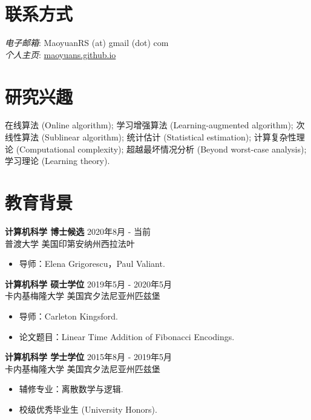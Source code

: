 \documentclass[margin, 10pt]{res} %
\begin{document}
\begin{resume}

\section{联系方式}
\emph{电子邮箱}: MaoyuanRS (at) gmail (dot) com\\
\emph{个人主页}: \href{https://maoyuans.github.io}{maoyuans.github.io}

 
\section{研究兴趣}  

在线算法 (Online algorithm); 学习增强算法 (Learning-augmented algorithm); 次线性算法 (Sublinear algorithm); 统计估计 (Statistical estimation); 计算复杂性理论 (Computational complexity); 超越最坏情况分析 (Beyond worst-case analysis); 学习理论 (Learning theory).

\section{教育背景}

{\bf 计算机科学\; 博士候选} \hfill 2020年8月 - 当前 \\
普渡大学 \hfill 美国印第安纳州西拉法叶

\begin{itemize}
\item 导师：Elena Grigorescu，Paul Valiant.
\end{itemize} 

{\bf 计算机科学\; 硕士学位} \hfill 2019年5月 - 2020年5月 \\
卡内基梅隆大学 \hfill 美国宾夕法尼亚州匹兹堡

\begin{itemize}
\item 导师：Carleton Kingsford. \hspace{-2em}
\item 论文题目：Linear Time Addition of Fibonacci Encodings.
\end{itemize} 

{\bf 计算机科学\; 学士学位} \hfill 2015年8月 - 2019年5月 \\
卡内基梅隆大学 \hfill 美国宾夕法尼亚州匹兹堡

\begin{itemize}
\item 辅修专业：离散数学与逻辑.
\item 校级优秀毕业生 (University Honors).
\end{itemize} 



\end{resume}
\end{document}
